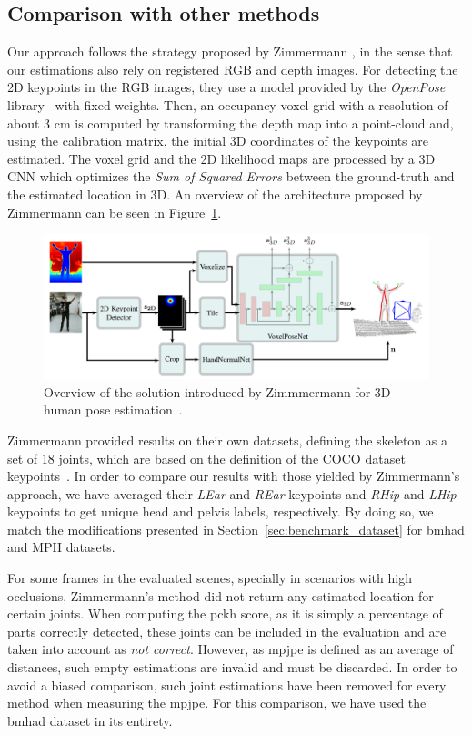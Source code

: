 \subsection{Comparison with other methods}
Our approach follows the strategy proposed by Zimmermann \etal\cite{Zimmermann2018-sn}, in the sense that our estimations also rely on registered RGB and depth images. For detecting the 2D keypoints in the RGB images, they use a model provided by the \emph{OpenPose} library~\cite{cao2018openpose} with fixed weights. Then, an occupancy voxel grid with a resolution of about 3 cm is computed by transforming the depth map into a point-cloud and, using the calibration matrix, the initial 3D coordinates of the keypoints are estimated. The voxel grid and the 2D likelihood maps are processed by a 3D CNN which optimizes the \emph{Sum of Squared Errors} between the ground-truth and the estimated location in 3D. An overview of the architecture proposed by Zimmermann \etal can be seen in Figure~\ref{fig:zimmermann}.

\begin{figure}[h]
    \centering
    \includegraphics[width=\textwidth]{figures/zimmermann.png}
    \caption{Overview of the solution introduced by Zimmmermann \etal for 3D human pose estimation~\cite{Zimmermann2018-sn}.}
    \label{fig:zimmermann}
\end{figure}

Zimmermann \etal provided results on their own datasets, defining the skeleton as a set of 18 joints, which are based on the definition of the COCO dataset keypoints~\cite{lin2014microsoft}. In order to compare our results with those yielded by Zimmermann's approach, we have averaged their \textit{LEar} and \textit{REar} keypoints and \textit{RHip} and \textit{LHip} keypoints to get unique head and pelvis labels, respectively. By doing so, we match the modifications presented in Section~\ref{sec:benchmark_dataset} for \gls{bmhad} and MPII datasets.

For some frames in the evaluated scenes, specially in scenarios with high occlusions, Zimmermann's method did not return any estimated location for certain joints. When computing the \gls{pckh} score, as it is simply a percentage of parts correctly detected, these joints can be included in the evaluation and are taken into account as \textit{not correct}. However, as \gls{mpjpe} is defined as an average of distances, such empty estimations are invalid and must be discarded. In order to avoid a biased comparison, such joint estimations have been removed for every method when measuring the \gls{mpjpe}. For this comparison, we have used the \gls{bmhad} dataset in its entirety.

